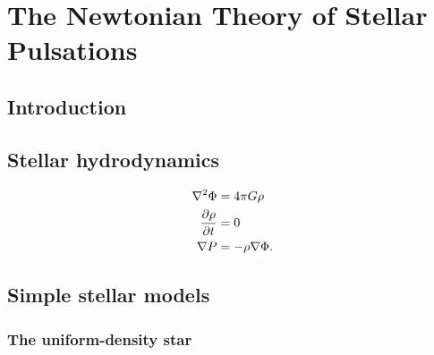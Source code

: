 
\chapter{The Newtonian Theory of Stellar Pulsations\label{ch:chapter2}}

\section{Introduction}\label{sec:chapter2:intro}
\lipsum[1]

\section{Stellar hydrodynamics}\label{sec:chapter2:hydro}
\lipsum[2]
\lipsum[3][1-2]
\begin{subequations} \label{eq:chapter2:static1}
\begin{align} 
	\nabla^2\Phi &= 4\pi G\rho\label{eq:chapter2:static1A}\\
	\frac{\partial\rho}{\partial t} &= 0\\
	\nabla P &= -\rho\nabla\Phi\label{eq:chapter2:euler}.
\end{align}
\end{subequations}
\lipsum[3][3-4]


\section{Simple stellar models}\label{sec:chapter2:stellar}
\lipsum[6]

\subsection{The uniform-density star}\label{subsec:chapter2:uniform}
\lipsum[7]

